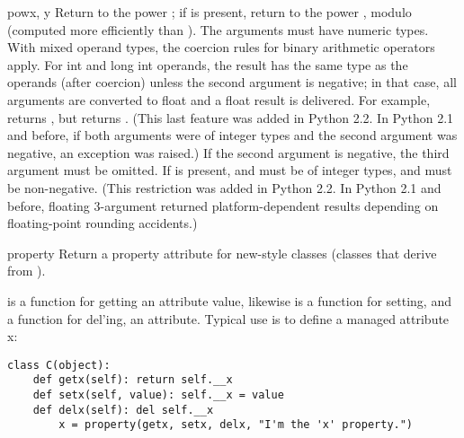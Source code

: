 \begin{funcdesc}{pow}{x, y}
  Return  to the power ; if  is present, return
   to the power , modulo  (computed more
  efficiently than ).  The
  arguments must have numeric types.  With mixed operand types, the
  coercion rules for binary arithmetic operators apply.  For int and
  long int operands, the result has the same type as the operands
  (after coercion) unless the second argument is negative; in that
  case, all arguments are converted to float and a float result is
  delivered.  For example,  returns , but
   returns .  (This last feature was added in
  Python 2.2.  In Python 2.1 and before, if both arguments were of integer
  types and the second argument was negative, an exception was raised.)
  If the second argument is negative, the third argument must be omitted.
  If  is present,  and  must be of integer types,
  and  must be non-negative.  (This restriction was added in
  Python 2.2.  In Python 2.1 and before, floating 3-argument 
  returned platform-dependent results depending on floating-point
  rounding accidents.)
\end{funcdesc}

\begin{funcdesc}{property}{}
  Return a property attribute for new-style classes (classes that
  derive from ).

   is a function for getting an attribute value, likewise
   is a function for setting, and  a function
  for del'ing, an attribute.  Typical use is to define a managed attribute x:

\begin{verbatim}
class C(object):
    def getx(self): return self.__x
    def setx(self, value): self.__x = value
    def delx(self): del self.__x
        x = property(getx, setx, delx, "I'm the 'x' property.")
\end{verbatim}

\end{funcdesc}


